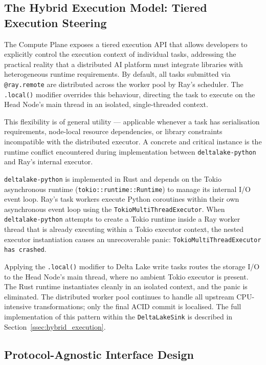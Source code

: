 \documentclass[12pt, a4paper]{report}
\begin{document}
\subsection{The Hybrid Execution Model: Tiered Execution Steering}
\label{ssec:splitbrain}

The Compute Plane exposes a tiered execution API that allows developers to explicitly
control the execution context of individual tasks, addressing the practical reality that
a distributed AI platform must integrate libraries with heterogeneous runtime
requirements.
By default, all tasks submitted via \texttt{@ray.remote} are distributed across the
worker pool by Ray's scheduler.
The \texttt{.local()} modifier overrides this behaviour, directing the task to execute
on the Head Node's main thread in an isolated, single-threaded context.

This flexibility is of general utility — applicable whenever a task has serialisation
requirements, node-local resource dependencies, or library constraints incompatible
with the distributed executor.
A concrete and critical instance is the runtime conflict encountered during
implementation between \texttt{deltalake-python} and Ray's internal executor.

\texttt{deltalake-python} is implemented in Rust and depends on the Tokio asynchronous
runtime (\texttt{tokio::runtime::Runtime}) to manage its internal I/O event loop.
Ray's task workers execute Python coroutines within their own asynchronous event loop
using the \texttt{TokioMultiThreadExecutor}.
When \texttt{deltalake-python} attempts to create a Tokio runtime inside a Ray worker
thread that is already executing within a Tokio executor context, the nested executor
instantiation causes an unrecoverable panic:
\texttt{TokioMultiThreadExecutor has crashed}.

Applying the \texttt{.local()} modifier to Delta Lake write tasks routes the storage
I/O to the Head Node's main thread, where no ambient Tokio executor is present.
The Rust runtime instantiates cleanly in an isolated context, and the panic is
eliminated.
The distributed worker pool continues to handle all upstream CPU-intensive
transformations; only the final ACID commit is localised.
The full implementation of this pattern within the \texttt{DeltaLakeSink} is described
in Section~\ref{ssec:hybrid_execution}.

\subsection{Protocol-Agnostic Interface Design}
\label{ssec:mcp_design}
\end{document}
